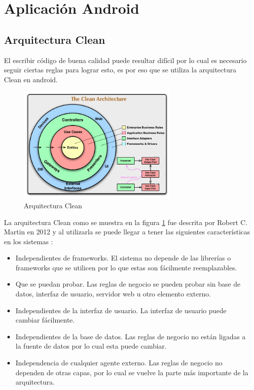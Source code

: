 \section{Aplicación Android} 
\subsection{Arquitectura Clean}
El escribir código de buena calidad puede resultar difícil por lo cual es necesario seguir ciertas reglas para lograr esto, es por eso que se utiliza la arquitectura Clean en android.

\begin{figure}[H]
        \centering
        \includegraphics[width=0.7\textwidth]{capitulo2/android/img/cleanArquitectura.jpg}
        \caption{Arquitectura Clean \cite{cleanCodeBlog}} 
        \label{fig:cleanArquitectura}
\end{figure}

La arquitectura Clean como se muestra en la figura \ref{fig:cleanArquitectura} fue descrita por Robert C. Martin en 2012 y al utilizarla se puede llegar a tener las siguientes características en los sistemas \cite{cleanCodeBlog}:
\begin{itemize}
    \item Independientes de frameworks. El sistema no depende de las librerías o frameworks que se utilicen por lo que estas son fácilmente reemplazables.
    \item Que se puedan probar. Las reglas de negocio se pueden probar sin base de datos, interfaz de usuario, servidor web u otro elemento externo.
    \item Independientes de la interfaz de usuario. La interfaz de usuario puede cambiar fácilmente.
    \item Independientes de la base de datos. Las reglas de negocio no están ligadas a la fuente de datos por lo cual esta puede cambiar.
    \item Independencia de cualquier agente externo. Las reglas de negocio no dependen de otras capas, por lo cual se vuelve la parte más importante de la arquitectura.
\end{itemize}

